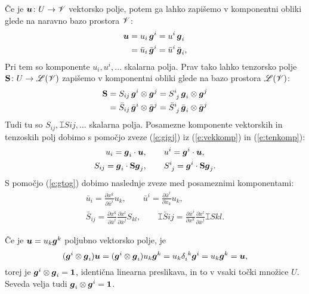 Če je $\boldsymbol u\colon U\to\mathscr V$ vektorsko polje, potem ga lahko zapišemo v komponentni
obliki glede na naravno bazo prostora $\mathscr V$:
\begin{align}
	\boldsymbol u&=u_i\,\boldsymbol g^i=u^i\,\boldsymbol g_i \nonumber \\
	&=\bar{u}_i\,\bar{\boldsymbol g}^i=\bar{u}^i\,\bar{\boldsymbol g}_i, \label{e:vekkomp}
\end{align}
Pri tem so komponente $u_i,u^i,\dots$ skalarna polja.
Prav tako lahko tenzorsko polje $\mathbf S\colon U\to\mathscr L(\mathscr V)$ zapišemo v
komponentni obliki glede na bazo prostora $\mathscr L(\mathscr V)$:
\begin{align}
	\ten{S}&=S_{ij}\,\vek{g}^i\otimes\vek{g}^j=\topbot{S}{i}{j}\,\vek{g}_i\otimes\vek{g}^j \nonumber \\
	&=\bar{S}_{ij}\,\bar{\vek{g}}^i\otimes\bar{\vek{g}}^j=
	\topbot{\bar{S}}{i}{j}\,\bar{\vek{g}}_i\otimes\bar{\vek{g}}^j \label{e:tenkomp}
\end{align}
Tudi tu so $S_{ij},\topbot{S}{i}{j},\dots$ skalarna polja.
Posamezne komponente vektorskih in tenzoskih polj dobimo s pomočjo zveze (\ref{e:gigj})
iz (\ref{e:vekkomp}) in (\ref{e:tenkomp}):
\begin{gather}
	u_i=\vek{g}_i\cdot\vek{u},\qquad u^i=\vek{g}^i\cdot\vek{u}, \label{e:kompvek} \\
	S_{ij}=\vek{g}_i\cdot\ten{S}\vek{g}_j,\qquad\topbot{S}{i}{j}=\vek{g}^i\cdot\ten{S}\vek{g}_j.\label{e:kompten}
\end{gather}
S pomočjo (\ref{e:gtog}) dobimo naslednje zveze med posameznimi komponentami:
\begin{gather*}
	\bar{u}_i=\frac{\partial x^k}{\partial\bar{x}^i}u_k, \qquad
	\bar{u}^i=\frac{\partial\bar{x}^i}{\partial x_k}u_k, \\
	\bar{S}_{ij}=\frac{\partial x^k}{\partial\bar{x}^i}\frac{\partial x^l}{\partial\bar{x}^j}S_{kl}, \qquad
	\topbot{\bar{S}}{i}{j}=\frac{\partial\bar{x}^i}{\partial x^k}\frac{\partial x^l}{\partial\bar{x}^j}\topbot{S}{k}{l}.
\end{gather*}

Če je $\boldsymbol u=u_k\boldsymbol g^k$ poljubno vektorsko polje, je
\begin{equation} \label{e:iten}
	(\vek{g}^i\otimes\vek{g}_i)\vek{u}=(\vek{g}^i\otimes\vek{g}_i)u_k\vek{g}^k=
	u_k\bottop{\delta}{i}{k}\vek{g}^i=u_k\vek{g}^k=\vek{u},
\end{equation}
torej je $\boldsymbol g^i\otimes\boldsymbol g_i=\mathbf 1$, identična linearna preslikava, in to
v vsaki točki množice $U$. Seveda velja tudi $\boldsymbol g_i\otimes\boldsymbol g^i=\mathbf 1$.


